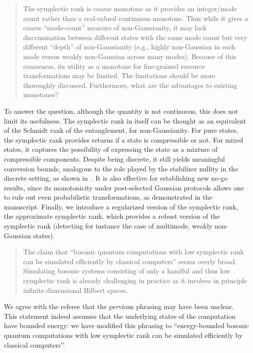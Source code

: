 \documentclass[a4paper,12pt]{article}
\newenvironment{Referee}[1]
{\noindent {\bf Comment #1:} \begin{quote} }
{\end{quote}\vspace{0 cm}}
\newenvironment{Response}
{\noindent \color{RawSienna}{\bf Response:} }
{\vspace{0.4 cm}}
\begin{document}
\begin{Referee}{2}
The symplectic rank is coarse monotone as it provides an integer/mode count rather than a real-valued continuous monotone. Thus while it gives a coarse ``mode-count'' measure of non-Gaussianity, it may lack discrimination between different states with the same mode count but very different ``depth'' of non-Gaussianity (e.g., highly non-Gaussian in each mode versus weakly non-Gaussian across many modes). Because of this coarseness, its utility as a monotone for fine-grained resource transformations may be limited. The limitations should be more thoroughly discussed. Furthermore, what are the advantages to existing monotones?
\end{Referee}

\begin{Response} To answer the question, although the quantity is not continuous, this does not limit its usefulness. The symplectic rank in itself can be thought as an equivalent of the Schmidt rank of the entanglement, for non-Gaussianity. For pure states, the symplectic rank provides returns if a state is compressible or not. For mixed states, it captures the possibility of expressing the state as a mixture of compressible components. Despite being discrete, it still yields meaningful conversion bounds, analogous to the role played by the stabilizer nullity in the discrete setting, as shown in~\cite{Beverland_2020}. It is also effective for establishing new no-go results, since its monotonicity under post-selected Gaussian protocols allows one to rule out even probabilistic transformations, as demonstrated in the manuscript. Finally, we introduce a regularized version of the symplectic rank, the approximate symplectic rank, which provides a robust version of the symplectic rank (detecting for instance the case of multimode, weakly non-Gaussian states).
\end{Response} 

\begin{Referee}{3}
The claim that ``bosonic quantum computations with low symplectic rank can be simulated efficiently by classical computers'' seems overly broad. Simulating bosonic systems consisting of only a handful and thus low symplectic rank is already challenging in practice as it involves in principle infinite dimensional Hilbert spaces.
\end{Referee}

\begin{Response} We agree with the referee that the previous phrasing may have been unclear. This statement indeed assumes that the underlying states of the computation have bounded energy: we have modified this phrasing to ``energy-bounded bosonic quantum computations with low symplectic rank can be simulated efficiently by classical computers''.
    
\end{Response}
\end{document}
